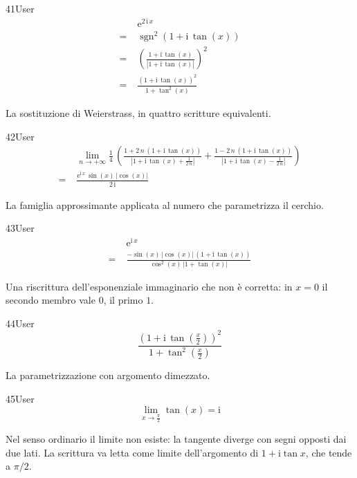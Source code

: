 \begin{espr}{41}{User}{}
\begin{align*}
& \mathrm{e}^{2\, \mathrm{i}\, x} \\
=\;& \operatorname{sgn}^{2}\!\left(1 + \mathrm{i}\, \tan\!\left(x\right)\right) \\
=\;& \left(\frac{1 + \mathrm{i}\, \tan\!\left(x\right)}{\left|1 + \mathrm{i}\, \tan\!\left(x\right)\right|}\right)^{2} \\
=\;& \frac{\left(1 + \mathrm{i}\, \tan\!\left(x\right)\right)^{2}}{1 + \tan^{2}\!\left(x\right)}
\end{align*}
\end{espr}
La sostituzione di Weierstrass, in quattro scritture equivalenti.

\begin{espr}{42}{User}{}
\begin{align*}
& \lim_{n \to +\infty} \frac{1}{4}\, \left(\frac{1 + 2\, n\, \left(1 + \mathrm{i}\, \tan\!\left(x\right)\right)}{\left|1 + \mathrm{i}\, \tan\!\left(x\right) + \frac{1}{2\, n}\right|} + \frac{1 - 2\, n\, \left(1 + \mathrm{i}\, \tan\!\left(x\right)\right)}{\left|1 + \mathrm{i}\, \tan\!\left(x\right) - \frac{1}{2\, n}\right|}\right) \\
=\;& \frac{\mathrm{e}^{\mathrm{i}\, x}\, \sin\!\left(x\right)\, \left|\cos\!\left(x\right)\right|}{2\, \mathrm{i}}
\end{align*}
\end{espr}
La famiglia approssimante applicata al numero che parametrizza il cerchio.

\begin{espr}{43}{User}{}
\begin{align*}
& \mathrm{e}^{\mathrm{i}\, x} \\
=\;& \frac{-\sin\!\left(x\right)\, \left|\cos\!\left(x\right)\right|\, \left(1 + \mathrm{i}\, \tan\!\left(x\right)\right)}{\cos^{2}\!\left(x\right)\, \left|1 + \tan\!\left(x\right)\right|}
\end{align*}
\end{espr}
Una riscrittura dell'esponenziale immaginario che non è corretta: in $x=0$ il secondo membro vale $0$, il primo $1$.

\begin{espr}{44}{User}{}
\[
\frac{\left(1 + \mathrm{i}\, \tan\!\left(\frac{x}{2}\right)\right)^{2}}{1 + \tan^{2}\!\left(\frac{x}{2}\right)}
\]
\end{espr}
La parametrizzazione con argomento dimezzato.

\begin{espr}{45}{User}{}
\[
\lim_{x \to \frac{\pi}{2}} \tan\!\left(x\right) = \mathrm{i}
\]
\end{espr}
Nel senso ordinario il limite non esiste: la tangente diverge con segni opposti dai due lati. La scrittura va letta come limite dell'argomento di $1+\mathrm{i}\tan x$, che tende a $\pi/2$.

